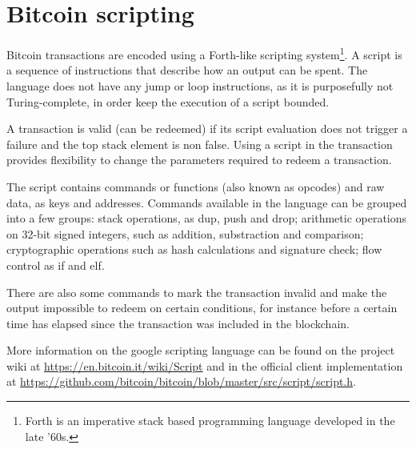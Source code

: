 \section{Bitcoin scripting} \label{sec:appendix_script}

Bitcoin transactions are encoded using a Forth-like scripting
 system\footnote{Forth is an imperative stack based programming language
                 developed in the late '60s.}.
A script is a sequence of instructions that describe how an output can be
  spent.
The language does not have any jump or loop instructions, as it is purposefully
  not Turing-complete, in order keep the execution of a script bounded.

A transaction is valid (can be redeemed) if its script evaluation does not
  trigger a failure and the top stack element is non false.
Using a script in the transaction provides flexibility to change the
  parameters required to redeem a transaction.

The script contains commands or functions (also known as opcodes) and raw data,
  as keys and addresses.
Commands available in the language can be grouped into a few groups:
  stack operations, as dup, push and drop;
  arithmetic operations on 32-bit signed integers, such as addition,
    substraction and comparison;
  cryptographic operations such as hash calculations and signature check;
  flow control as if and elf.

There are also some commands to mark the transaction invalid and make the
  output impossible to redeem on certain conditions, for instance before a
  certain time has elapsed since the transaction was included in the
  blockchain.

More information on the google scripting language can be found on the project
  wiki at \url{https://en.bitcoin.it/wiki/Script} and in the official client
  implementation at
  \url{https://github.com/bitcoin/bitcoin/blob/master/src/script/script.h}.




